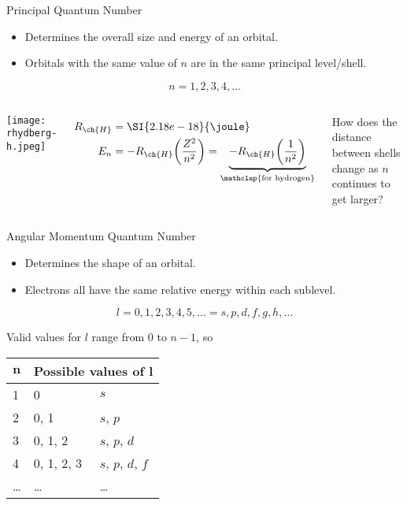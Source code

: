\documentclass[notes=onlyslideswithnotes,notes=hide]{beamer}
\begin{document}
\begin{frame}{Principal Quantum Number}
	\begin{itemize}
		\item Determines the overall \alert{size} and \alert{energy} of an orbital.
		\item Orbitals with the same value of $n$ are in the \alert{same}
			principal level/shell.
	\end{itemize}

	\begin{equation*}
		n = 1, 2, 3, 4, \ldots
	\end{equation*}

	\begin{columns}
		\begin{center}
		\texttt{[image: rhydberg-h.jpeg]}
		\end{center}
		\begin{align*}
			R_{\ch{H}} &= \SI{2.18e-18}{\joule} \\
			E_n &= -R_{\ch{H}}\bigg(\frac{Z^2}{n^2}\bigg)
			=
			\underbrace{-R_{\ch{H}}\bigg(\frac{1}{n^2}\bigg)}_{\mathclap{\text{for
			hydrogen}}}
		\end{align*}

		\pause

		How does the distance between shells change as $n$ continues to
		get larger?
	\end{columns}
\end{frame}

\begin{frame}{Angular Momentum Quantum Number}
	\begin{itemize}
		\item Determines the \alert{shape} of an orbital.
		\item Electrons all have the same relative energy within each
			\alert{sublevel}.
	\end{itemize}
	\begin{equation*}
		l = 0, 1, 2, 3, 4, 5, \ldots =
		s, p, d, f, g, h, \ldots
	\end{equation*}

	Valid values for $l$ range from 0 to $n-1$, so
	\begin{center}
		\begin{tabular} {l l l}
			\toprule\bfseries $\bm{n}$ &
			\multicolumn{2}{l}{\bfseries Possible values
			of $\bm{l}$} \\
		\midrule
			1 & 0          & $s$ \\
			2 & 0, 1       & $s$, $p$ \\
			3 & 0, 1, 2    & $s$, $p$, $d$ \\
			4 & 0, 1, 2, 3 & $s$, $p$, $d$, $f$ \\
			\ldots & \ldots & \ldots \\ \bottomrule
	\end{tabular}
	\end{center}
\end{frame}
\end{document}
